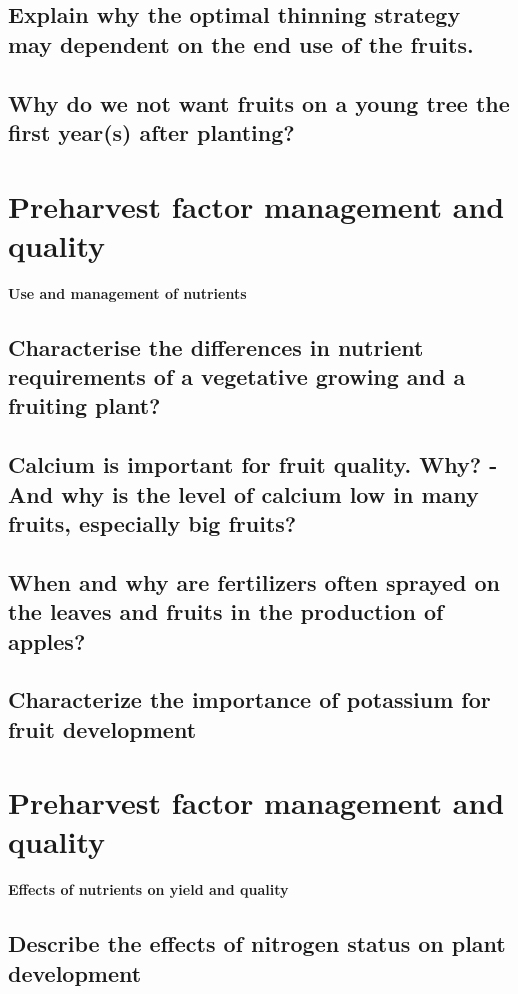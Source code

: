 \subsection{Explain why the optimal thinning strategy may dependent on the end 
use of the fruits.}
\subsection{Why do we not want fruits on a young tree the first year(s) after 
planting?}


\vspace{1em}
\section{Preharvest factor management and quality}
\textbf{Use and management of nutrients}

\subsection{Characterise the differences in nutrient requirements of a vegetative 
growing and a fruiting plant?}
\subsection{Calcium is important for fruit quality. Why? - And why is the level 
of calcium low in many fruits, especially big fruits?}
\subsection{When and why are fertilizers often sprayed on the leaves and fruits in 
the production of apples?}
\subsection{Characterize the importance of potassium for fruit development}


\vspace{1em}
\section{Preharvest factor management and quality}
\textbf{Effects of nutrients on yield and quality}

\subsection{Describe the effects of nitrogen status on plant development}
